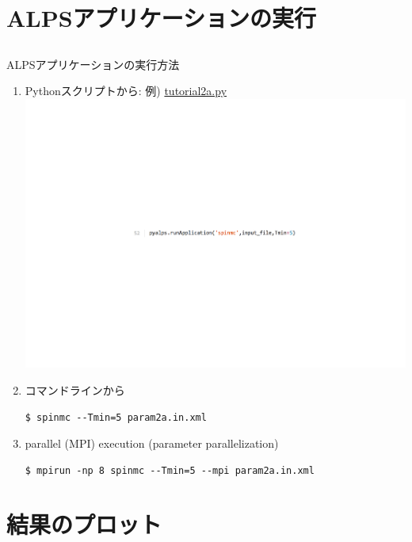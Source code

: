 \section{ALPSアプリケーションの実行}

\subsection*{\redm\whiteb\greenb}
\begin{frame}[t,fragile]{ALPSアプリケーションの実行方法}
  \begin{enumerate}
  \item Pythonスクリプトから: 例) \href{https://github.com/cmsi/alps-tutorial/blob/tutorials/tutorials/mc-02-susceptibilities/tutorial2a.py}{tutorial2a.py}
    \includegraphics[height=.08\textheight]{tutorial2a-2.pdf}
  \item コマンドラインから
\begin{lstlisting}
$ spinmc --Tmin=5 param2a.in.xml
\end{lstlisting}
  \item parallel (MPI) execution (parameter parallelization)
\begin{lstlisting}
$ mpirun -np 8 spinmc --Tmin=5 --mpi param2a.in.xml
\end{lstlisting}
  \end{enumerate}
\end{frame}

\section{結果のプロット}

